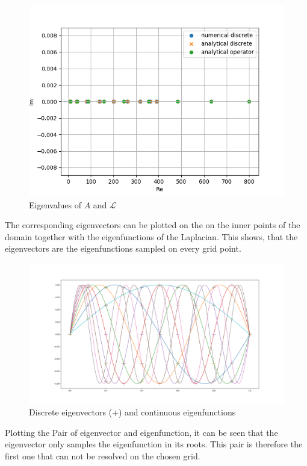 \documentclass{article}
\begin{document}
\begin{figure}[H]
    \centering
    \includegraphics[width=.9\linewidth]{eigenvals.png}
    \caption{Eigenvalues of $A$ and $\mathcal{L}$}
\end{figure}
The corresponding eigenvectors can be plotted on the on the inner points of the domain together with the eigenfunctions of the Laplacian. This shows, that the eigenvectors are the eigenfunctions sampled on every grid point.
\begin{figure}[H]
    \centering
    \includegraphics[width=.9\linewidth]{Eigenfuncs.png}
    \caption{Discrete eigenvectors (+) and continuous eigenfunctions}
\end{figure}

Plotting the  Pair of eigenvector and eigenfunction, it can be seen that the eigenvector only samples the eigenfunction in its roots.  This pair is therefore the first one that can not be resolved on the chosen grid.
\end{document}
